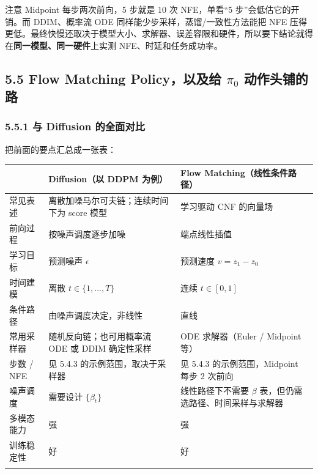 \documentclass[
  chinese,
]{ctexart}
\begin{document}
注意 Midpoint 每步两次前向，5 步就是 10 次 NFE，单看``5
步''会低估它的开销。而 DDIM、概率流 ODE
同样能少步采样，蒸馏/一致性方法能把 NFE
压得更低。最终快慢还取决于模型大小、求解器、误差容限和硬件，所以要下结论就得在\textbf{同一模型、同一硬件}上实测
NFE、时延和任务成功率。

\subsection{\texorpdfstring{5.5 Flow Matching Policy，以及给 \(\pi_0\)
动作头铺的路}{5.5 Flow Matching Policy，以及给 \textbackslash pi\_0 动作头铺的路}}\label{flow-matching-policyux4ee5ux53caux7ed9-pi_0-ux52a8ux4f5cux5934ux94faux7684ux8def}

\subsubsection{5.5.1 与 Diffusion
的全面对比}\label{ux4e0e-diffusion-ux7684ux5168ux9762ux5bf9ux6bd4}

把前面的要点汇总成一张表：

\begin{center}
\begin{tabular}{@{}>{\raggedright\arraybackslash}p{} >{\raggedright\arraybackslash}p{} >{\raggedright\arraybackslash}p{}@{}}
\toprule\noalign{}
 & Diffusion（以 DDPM 为例） & Flow Matching（线性条件路径） \\
\midrule\noalign{}
常见表述 & 离散加噪马尔可夫链；连续时间下为 score 模型 & 学习驱动 CNF 的向量场 \\
前向过程 & 按噪声调度逐步加噪 & 端点线性插值 \\
学习目标 & 预测噪声 \(\epsilon\) & 预测速度 \(v = z_1 - z_0\) \\
时间建模 & 离散 \(t \in \{1, \ldots, T\}\) & 连续 \(t \in [0, 1]\) \\
条件路径 & 由噪声调度决定，非线性 & 直线 \\
常用采样器 & 随机反向链；也可用概率流 ODE 或 DDIM 确定性采样 & ODE 求解器（Euler / Midpoint 等） \\
步数 / NFE & 见 5.4.3 的示例范围，取决于采样器 & 见 5.4.3 的示例范围，Midpoint 每步 2 次前向 \\
噪声调度 & 需要设计 \(\{\beta_t\}\) & 线性路径下不需要 \(\beta\) 表，但仍需选路径、时间采样与求解器 \\
多模态能力 & 强 & 强 \\
训练稳定性 & 好 & 好 \\
\bottomrule\noalign{}
\end{tabular}
\end{center}
\end{document}
